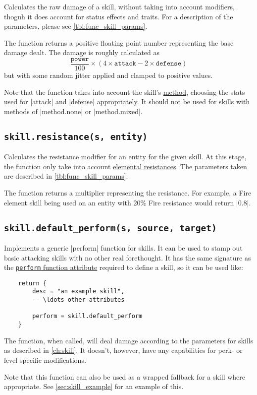 Calculates the raw damage of a skill,
without taking into account modifiers,
thoguh it does account for status effects and traits.
For a description of the parameters, please see \autoref{tbl:func_skill_params}.

The function returns a positive floating point number
representing the base damage dealt. The damage is roughly calculated as
\[ \frac{\texttt{power}}{100}\times(4\times\texttt{attack} - 2\times\texttt{defense}) \]
but with some random jitter applied and clamped to positive values.

Note that the function takes into account the skill's
\hyperref[tbl:opt_method_spread]{method},
choosing the stats used for |attack| and |defense| appropriately.
It should not be used for skills with methods of |method.none| or |method.mixed|.

\subsection{\lstinline{skill.resistance(s, entity)}}
\label{sec:func_skill_resistance}

Calculates the resistance modifier for an entity for the given skill.
At this stage, the function only take into account
\hyperref[ch:elements]{elemental resistances}.
The parameters taken are described in \autoref{tbl:func_skill_params}.

The function returns a multiplier representing the resistance.
For example, a Fire element skill being used on
an entity with 20\% Fire resistance would return |0.8|.


\subsection{\lstinline{skill.default_perform(s, source, target)}}
\label{sec:func_skill_defaultperform}

Implements a generic |perform| function for skills.
It can be used to stamp out basic attacking skills with no other real forethought.
It has the same signature as the
\hyperref[sec:skill_func]{\lstinline|perform| function attribute}
required to define a skill, so it can be used like:
\begin{lstlisting}
    return {
        desc = "an example skill",
        -- \ldots other attributes

        perform = skill.default_perform
    }
\end{lstlisting}

The function, when called, will deal damage
according to the parameters for skills as described in \autoref{ch:skill}.
It doesn't, however, have any capabilities for perk- or level-specific modifications.

Note that this function can also be used as
a wrapped fallback for a skill where appropriate.
See \autoref{sec:skill_example} for an example of this.
